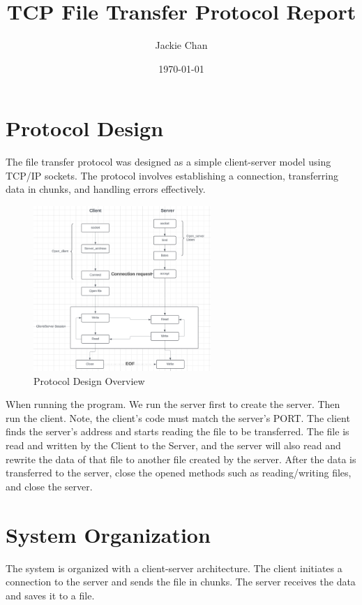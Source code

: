 \documentclass{article}
\title{TCP File Transfer Protocol Report}
\author{Jackie Chan}
\date{\today}
\begin{document}
	
	\maketitle
	
	\section{Protocol Design}
	The file transfer protocol was designed as a simple client-server model using TCP/IP sockets. The protocol involves establishing a connection, transferring data in chunks, and handling errors effectively.
	
	\begin{figure}[h]
		\centering
		\includegraphics[width=0.6\textwidth]{DesigeSystem.png}
		\caption{Protocol Design Overview}
	\end{figure}
	
	When running the program. We run the server first to create the server. Then run the client. Note, the client's code must match the server's PORT. The client finds the server's address and starts reading the file to be transferred. The file is read and written by the Client to the Server, and the server will also read and rewrite the data of that file to another file created by the server. After the data is transferred to the server, close the opened methods such as reading/writing files, and close the server.
	
	\section{System Organization}
	The system is organized with a client-server architecture. The client initiates a connection to the server and sends the file in chunks. The server receives the data and saves it to a file.
	
\end{document}
